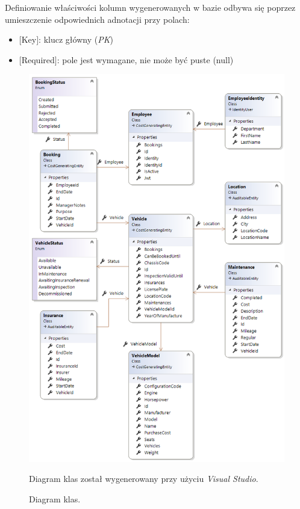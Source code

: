 \documentclass[eng,printmode,openany]{mgr}
\begin{document}
	Definiowanie właściwości kolumn wygenerowanych w bazie odbywa się poprzez umieszczenie odpowiednich adnotacji przy polach:
	\begin{itemize}
		\item $[$Key$]$: klucz główny (\textit{PK})
		\item $[$Required$]$: pole jest wymagane, nie może być puste (null)
	\end{itemize}
	
	
	
	
	
	\newpage 
	\begin{figure}[H]
		\centering
		\includegraphics[width=\textwidth]{images/vs_class_diagram.png}
		\caption{Diagram klas.}
		\small 
		Diagram klas został wygenerowany przy użyciu \textit{Visual Studio}.
	\end{figure}
	
\end{document}
